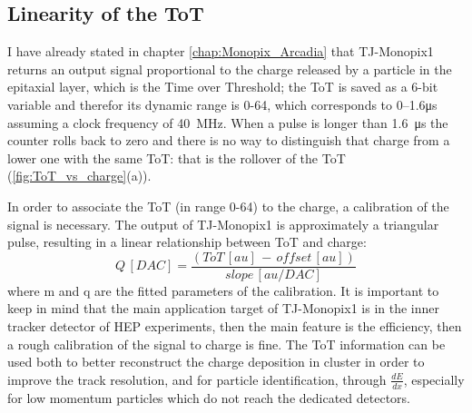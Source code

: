 
    \subsection{Linearity of the ToT}    
        I have already stated in chapter \ref{chap:Monopix_Arcadia} that TJ-Monopix1 returns an output signal proportional to the charge released by a particle in the epitaxial layer, which is the Time over Threshold; the ToT is saved as a 6-bit variable and therefor its dynamic range is 0-64, which corresponds to \numrange[range-phrase = --]{0}{1.6}\si{\us} assuming a clock frequency of \SI{40}{MHz}.
        When a pulse is longer than \SI{1.6}{\us} the counter rolls back to zero and there is no way to distinguish that charge from a lower one with the same ToT: that is the rollover of the ToT (\ref{fig:ToT_vs_charge}(a)).   

        In order to associate the ToT (in range 0-64) to the charge, a calibration of the signal is necessary. The output of TJ-Monopix1 is approximately a triangular pulse, resulting in a linear relationship between ToT and charge: 
        \begin{equation}
            Q\, [DAC] = \frac{(ToT\,[au]\, -\, offset\,[au])}{slope\, [au/DAC]} 
        \end{equation}\label{eq:calibration}
        where m and q are the fitted parameters of the calibration.
        It is important to keep in mind that the main application target of TJ-Monopix1 is in the inner tracker detector of HEP experiments, then the main feature is the efficiency, then a rough calibration of the signal to charge is fine. The ToT information can be used both to better reconstruct the charge deposition in cluster in order to improve the track resolution, and for particle identification, through $\frac{dE}{dx}$, especially for low momentum particles which do not reach the dedicated detectors.
                        
